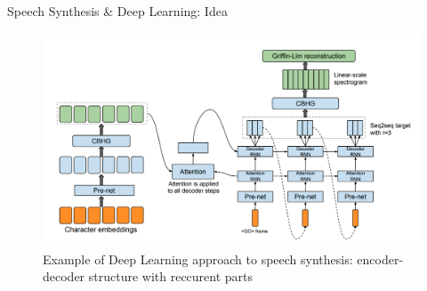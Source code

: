 \begin{frame}{Speech Synthesis \& Deep Learning: Idea}
	\begin{figure}
		\centering
		\includegraphics[width=0.99\linewidth]{figs/tts.png}
		\caption{Example of Deep Learning approach to speech synthesis: encoder-decoder structure with reccurent parts}
	\end{figure}
\end{frame}
 